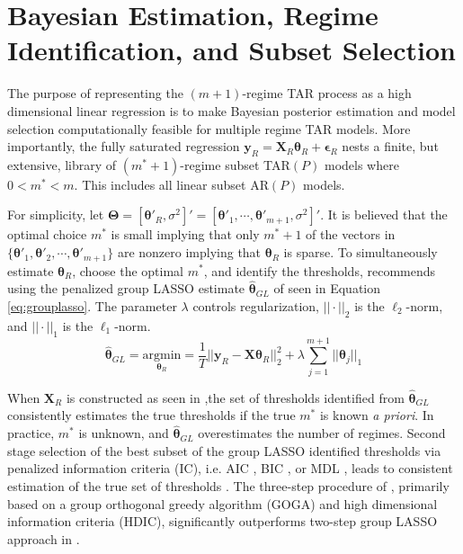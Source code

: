 \section{Bayesian Estimation, Regime Identification, and Subset Selection}
\label{sec:trafficest}

The purpose of representing the $(m+1)$-regime TAR process as a high dimensional linear regression is to make Bayesian posterior estimation and model selection computationally feasible for multiple regime TAR models. More importantly, the fully saturated regression $\bm{y}_R=\bm{X}_R\bm{\theta}_R+\bm{\epsilon}_R$ nests a finite, but extensive, library of $(m^*+1)$-regime subset TAR$(P)$ models where $0<m^*<m$. This includes all linear subset AR$(P)$ models.

For simplicity, let $\bm{\Theta}=[\bm{\theta}'_R,\sigma^2]'=[\bm{\theta}'_1,\cdots,\bm{\theta}'_{m+1},\sigma^2]'$. It is believed that the optimal choice $m^*$ is small implying that only $m^*+1$ of the vectors in $\{\bm{\theta}'_1,\bm{\theta}'_2,\cdots,\bm{\theta}'_{m+1}\}$ are nonzero implying that $\bm{\theta}_R$ is sparse. To simultaneously estimate $\bm{\theta}_R$, choose the optimal $m^*$, and identify the thresholds, \cite{Chan2015} recommends using the penalized group LASSO estimate $\hat{\bm{\theta}}_{GL}$ of \cite{Yuan2006} seen in Equation \ref{eq:grouplasso}. The parameter $\lambda$ controls regularization, $||\cdot||_2$ is the $\ell_2$-norm, and $||\cdot||_1$ is the $\ell_1$-norm.
\begin{equation}
\label{eq:grouplasso}
\hat{\bm{\theta}}_{GL}=\underset{\bm{\theta}_R}{\textrm{argmin}}=\frac{1}{T}||\bm{y}_R-\bm{X}\bm{\theta}_{R}||_2^2+\lambda\sum\limits_{j=1}^{m+1}||\bm{\theta}_j||_1
\end{equation}

When $\bm{X}_R$ is constructed as seen in \cite{Chan2015},the set of thresholds identified from $\hat{\bm{\theta}}_{GL}$ consistently estimates the true thresholds if the true $m^*$ is known \textit{a priori}. In practice, $m^*$ is unknown, and $\hat{\bm{\theta}}_{GL}$ overestimates the number of regimes. Second stage selection of the best subset of the group LASSO identified thresholds via penalized information criteria (IC), i.e. AIC \citep{Li2012}, BIC \citep{Yao1988}, or MDL \citep{Davis2006}, leads to consistent estimation of the true set of thresholds \citep{Chan2015}. The three-step procedure of \cite{Chan2017}, primarily based on a group orthogonal greedy algorithm (GOGA) and high dimensional information criteria (HDIC), significantly outperforms two-step group LASSO approach in \cite{Chan2015}.

